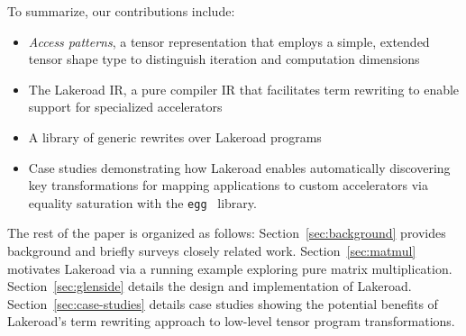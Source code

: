 \documentclass[prologue, dvipsnames, sigplan, screen, review, anonymous]{acmart}
\newcommand{\g}{Lakeroad\xspace}
\newcommand{\tcd}[1]{\texttt{#1}}
\begin{document}
To summarize, our contributions include:
\begin{itemize}
\item \textit{Access patterns},
  a tensor representation that employs a
  simple, extended tensor shape type to
  distinguish iteration and computation dimensions

\item The \g IR,
  a pure compiler IR that facilitates 
  term rewriting to enable support for
  specialized accelerators
  
\item A library of generic rewrites over \g programs
  
\item Case studies demonstrating how
  \g enables automatically discovering
  key transformations for mapping
  applications to custom accelerators
  via equality saturation with the
  \tcd{egg}~\cite{willsey2021egg} library.
\end{itemize}

The rest of the paper is organized as follows:
Section~\ref{sec:background} provides background
  and briefly surveys closely related work.
Section~\ref{sec:matmul} motivates
  \g via a running example exploring
  pure matrix multiplication.
Section~\ref{sec:glenside} details the
  design and implementation of \g.
Section~\ref{sec:case-studies} details
  case studies showing the potential
  benefits of \g's term rewriting
  approach to low-level tensor program
  transformations.

  
  
\end{document}
